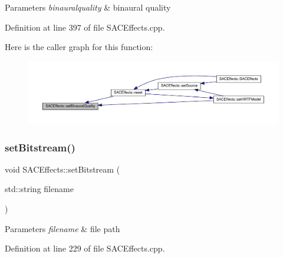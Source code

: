 \begin{DoxyParams}{Parameters}
{\em binauralquality} & binaural quality \\
\hline
\end{DoxyParams}


Definition at line 397 of file S\+A\+C\+Effects.\+cpp.

Here is the caller graph for this function\+:
\nopagebreak
\begin{figure}[H]
\begin{center}
\leavevmode
\includegraphics[width=350pt]{class_s_a_c_effects_aa0b1fa3cd01ea58fd6ae155dd3b12566_icgraph}
\end{center}
\end{figure}
\mbox{\label{class_s_a_c_effects_a4ff113bcbd922362d8fcb9ef61d3641b}} 
\subsubsection{\texorpdfstring{set\+Bitstream()}{setBitstream()}}
{\footnotesize\ttfamily void S\+A\+C\+Effects\+::set\+Bitstream (\begin{DoxyParamCaption}\item[{std\+::string}]{filename }\end{DoxyParamCaption})}


\begin{DoxyParams}{Parameters}
{\em filename} & file path \\
\hline
\end{DoxyParams}


Definition at line 229 of file S\+A\+C\+Effects.\+cpp.

